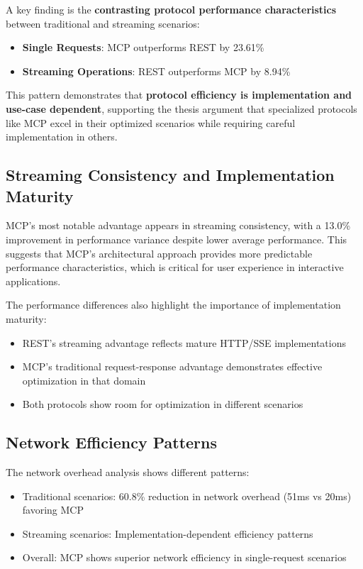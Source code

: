 A key finding is the \textbf{contrasting protocol performance characteristics} between traditional and streaming scenarios:

\begin{itemize}
    \item \textbf{Single Requests}: MCP outperforms REST by 23.61\%
    \item \textbf{Streaming Operations}: REST outperforms MCP by 8.94\%
\end{itemize}

This pattern demonstrates that \textbf{protocol efficiency is implementation and use-case dependent}, supporting the thesis argument that specialized protocols like MCP excel in their optimized scenarios while requiring careful implementation in others.

\subsection{Streaming Consistency and Implementation Maturity}

MCP's most notable advantage appears in streaming consistency, with a 13.0\% improvement in performance variance despite lower average performance. This suggests that MCP's architectural approach provides more predictable performance characteristics, which is critical for user experience in interactive applications.

The performance differences also highlight the importance of implementation maturity:
\begin{itemize}
    \item REST's streaming advantage reflects mature HTTP/SSE implementations
    \item MCP's traditional request-response advantage demonstrates effective optimization in that domain
    \item Both protocols show room for optimization in different scenarios
\end{itemize}

\subsection{Network Efficiency Patterns}

The network overhead analysis shows different patterns:
\begin{itemize}
    \item Traditional scenarios: 60.8\% reduction in network overhead (51ms vs 20ms) favoring MCP
    \item Streaming scenarios: Implementation-dependent efficiency patterns
    \item Overall: MCP shows superior network efficiency in single-request scenarios
\end{itemize}

